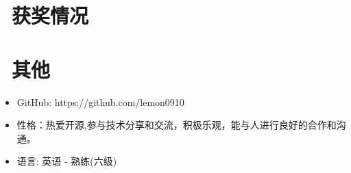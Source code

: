 \documentclass{resume}
\begin{document}
\section{\faHeartO\ 获奖情况}

\section{\faInfo\ 其他}
\begin{itemize}[parsep=0.5ex]
  \item GitHub: https://github.com/lemon0910
  \item 性格：热爱开源,参与技术分享和交流，积极乐观，能与人进行良好的合作和沟通。
  \item 语言: 英语 - 熟练(六级)
\end{itemize}

%
%
\end{document}
